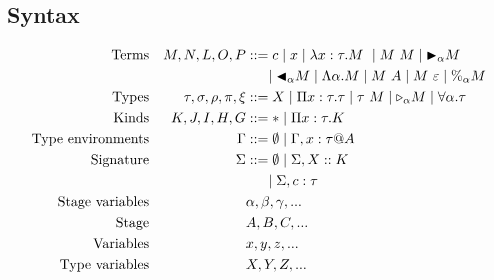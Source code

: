 \subsection{Syntax}

\begin{align*}
	\textrm{Terms}             &  & M,N,L,O,P                & ::= c \mid x \mid \lambda x:\tau.M\ \mid M\ M \mid \TB_\alpha M                                                                                    \\
	                           &  &                          & \ \ \ \ \mid \TBL_\alpha M \mid \Lambda\alpha.M \mid M\ A \mid M\ \varepsilon \mid \%_\alpha M                                                                       \\
	\textrm{Types}             &  & \tau,\sigma,\rho,\pi,\xi & ::= X \mid \Pi x:\tau.\tau \mid \tau\ M \mid \TW_{\alpha} M \mid \F\alpha.\tau                                                                     \\
	\textrm{Kinds}             &  & K,J,I,H,G                & ::= * \mid \Pi x:\tau.K                                                                                                                            \\
	\textrm{Type environments} &  & \Gamma                   & ::= \emptyset \mid \Gamma,x:\tau@A\\
	\textrm{Signature}         &  & \Sigma                   & ::= \emptyset \mid \Sigma,X::K\\
	                           &  &                          & \ \ \ \ \mid \Sigma,c:\tau\\
	\textrm{Stage variables}   &  &                          & \alpha,\beta,\gamma,...                                                                                                                            \\
	\textrm{Stage}             &  &                          & A,B,C,...                                                                                                                                          \\
	\textrm{Variables}         &  &                          & x,y,z,...                                                                                                                                          \\
	\textrm{Type variables}    &  &                          & X,Y,Z,...                                                                                                                                          \\
\end{align*}


